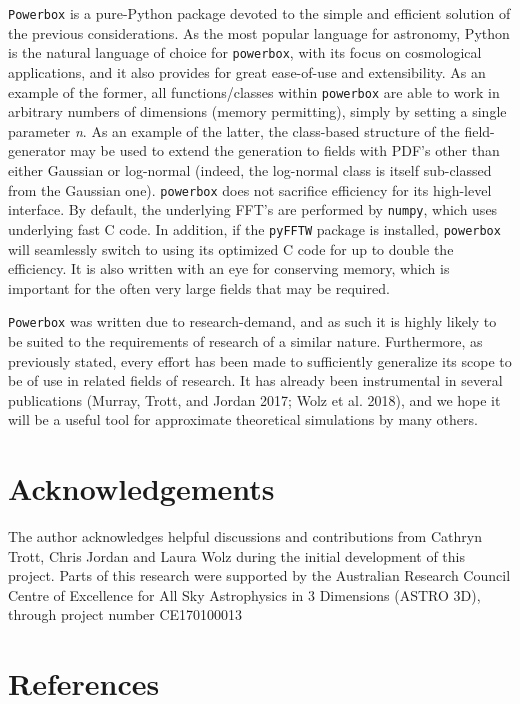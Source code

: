 \documentclass[10pt,a4paper,onecolumn]{article}
\begin{document}
\texttt{Powerbox} is a pure-Python package devoted to the simple and
efficient solution of the previous considerations. As the most popular
language for astronomy, Python is the natural language of choice for
\texttt{powerbox}, with its focus on cosmological applications, and it
also provides for great ease-of-use and extensibility. As an example of
the former, all functions/classes within \texttt{powerbox} are able to
work in arbitrary numbers of dimensions (memory permitting), simply by
setting a single parameter \emph{n}. As an example of the latter, the
class-based structure of the field-generator may be used to extend the
generation to fields with PDF's other than either Gaussian or log-normal
(indeed, the log-normal class is itself sub-classed from the Gaussian
one). \texttt{powerbox} does not sacrifice efficiency for its high-level
interface. By default, the underlying FFT's are performed by
\texttt{numpy}, which uses underlying fast C code. In addition, if the
\texttt{pyFFTW} package is installed, \texttt{powerbox} will seamlessly
switch to using its optimized C code for up to double the efficiency. It
is also written with an eye for conserving memory, which is important
for the often very large fields that may be required.

\texttt{Powerbox} was written due to research-demand, and as such it is
highly likely to be suited to the requirements of research of a similar
nature. Furthermore, as previously stated, every effort has been made to
sufficiently generalize its scope to be of use in related fields of
research. It has already been instrumental in several publications
(Murray, Trott, and Jordan 2017; Wolz et al. 2018), and we hope it will
be a useful tool for approximate theoretical simulations by many others.

\hypertarget{acknowledgements}{%
\section{Acknowledgements}\label{acknowledgements}}

The author acknowledges helpful discussions and contributions from
Cathryn Trott, Chris Jordan and Laura Wolz during the initial
development of this project. Parts of this research were supported by
the Australian Research Council Centre of Excellence for All Sky
Astrophysics in 3 Dimensions (ASTRO 3D), through project number
CE170100013

\hypertarget{references}{%
\section*{References}\label{references}}
\end{document}
